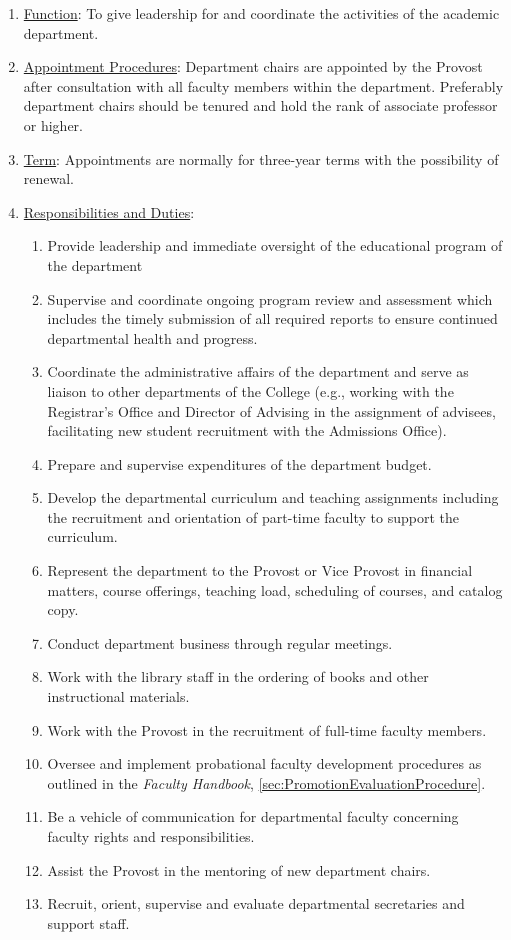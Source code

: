 					\begin{enumerate}
						\item{\underline{Function}:  To give leadership for and coordinate the activities of the academic department.}
						\item{\underline{Appointment Procedures}:  Department chairs are appointed by the Provost after consultation with all faculty members within the department.  Preferably department chairs should be tenured and hold the rank of associate professor or higher.}
						\item{\underline{Term}:  Appointments are normally for three-year terms with the possibility of renewal.}
						\item{\underline{Responsibilities and Duties}:
							\begin{enumerate}
								\item{Provide leadership and immediate oversight of the educational program of the department}
								\item{Supervise and coordinate ongoing program review and assessment which includes the timely submission of all required reports to ensure continued departmental health and progress.}
								\item{Coordinate the administrative affairs of the department and serve as liaison to other departments of the College (e.g., working with the Registrar's Office and Director of Advising in the assignment of advisees, facilitating new student recruitment with the Admissions Office).}
								\item{Prepare and supervise expenditures of the department budget.}
								\item{Develop the departmental curriculum and teaching assignments including the recruitment and orientation of part-time faculty to support the curriculum.}
								\item{Represent the department to the Provost or Vice Provost in financial matters, course offerings, teaching load, scheduling of courses, and catalog copy.}
								\item{Conduct department business through regular meetings.}
								\item{Work with the library staff in the ordering of books and other instructional materials.}
								\item{Work with the Provost in the recruitment of full-time faculty members.}
								\item{Oversee and implement probational faculty development procedures as outlined in the \emph{Faculty Handbook}, \ref{sec:PromotionEvaluationProcedure}.}
								\item{Be a vehicle of communication for departmental faculty concerning faculty rights and responsibilities.}
								\item{Assist the Provost in the mentoring of new department chairs.}
								\item{Recruit, orient, supervise and evaluate departmental secretaries and support staff.}
							\end{enumerate}
						}
					\end{enumerate}
